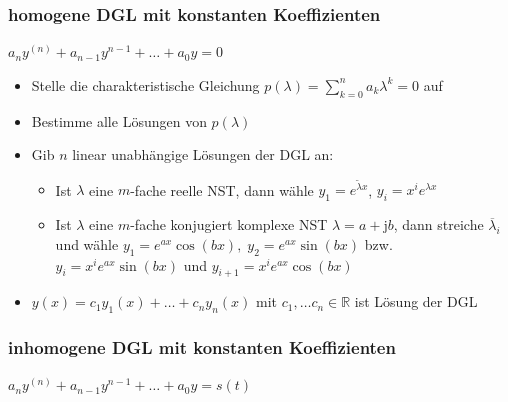 \documentclass[6pt,a4paper]{scrartcl}
\renewcommand{\i}{\ensuremath{\mathrm{j}}}										%
\newcommand{\R}{\ensuremath{\mathbb R}}
\begin{document}
\begin{multicols}{4}
	\subsubsection{homogene DGL mit konstanten Koeffizienten}
		$a_n y^{(n)} + a_{n-1} y^{n-1} + \ldots + a_0 y = 0$
\begin{itemize}[itemsep=0pt, leftmargin=8pt]
\item Stelle die charakteristische Gleichung $p(\lambda) = \sum^n_{k=0} a_k \lambda^k = 0$ auf
\item Bestimme alle Lösungen von $p(\lambda)$
\item Gib $n$ linear unabhängige Lösungen der DGL an:
	\begin{itemize}[itemsep=0pt, leftmargin=0cm]
		\item 	Ist $ \lambda$ eine $m$-fache reelle NST, dann wähle $y_1 = e^{\tilde \lambda x}$, \quad $y_i = x^i e^{ \lambda x}$\\
		\item Ist $ \lambda$ eine $m$-fache konjugiert komplexe NST $\lambda = a + \i b$, dann streiche $\overline \lambda_i$ und wähle $y_1 = e^{ax} \cos (bx),\; y_2 = e^{ax} \sin (bx)$ bzw. $y_i = x^i e^{ax} \sin (bx)$ und $y_{i+1} =  x^i e^{ax} \cos (bx)$
\end{itemize}
\item $y(x) = c_1 y_1 (x) + \ldots + c_n y_n (x)$ mit $c_1, \ldots c_n \in \R$ ist Lösung der DGL
\end{itemize}

	\subsubsection{inhomogene DGL mit konstanten Koeffizienten}
	$a_n y^{(n)} + a_{n-1} y^{n-1} + \ldots + a_0 y = s(t)$


\end{multicols}
\end{document}
